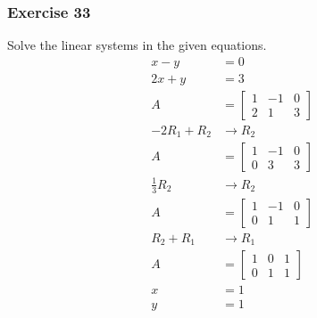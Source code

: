 \documentclass[letterpaper, 12pt]{math}
\begin{document}
\subsubsection*{Exercise 33}
Solve the linear systems in the given equations.
\begin{align*}
  x-y &= 0 \\
  2x+y &= 3 \\
  A &= \left[\begin{array}{cc|c}
    1 & -1 & 0 \\
    2 & 1 & 3
  \end{array}\right] \\
  -2R_1+R_2 &\to R_2 \\
  A &= \left[\begin{array}{cc|c}
    1 & -1 & 0 \\
    0 & 3 & 3
  \end{array}\right] \\
  \frac{1}{3}R_2 &\to R_2 \\
  A &= \left[\begin{array}{cc|c}
    1 & -1 & 0 \\
    0 & 1 & 1
  \end{array}\right] \\
  R_2+R_1 &\to R_1 \\
  A &= \left[\begin{array}{cc|c}
    1 & 0 & 1 \\
    0 & 1 & 1
  \end{array}\right] \\
  x &= 1 \\
  y &= 1
\end{align*}
\end{document}
